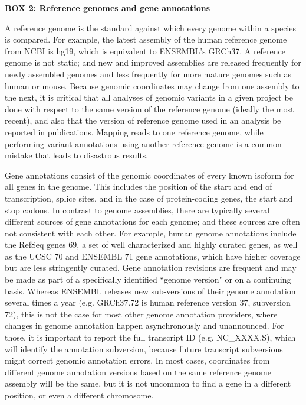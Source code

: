 \textbf{BOX 2: Reference genomes and gene annotations}
\begin{framed}
A reference genome is the standard against which every genome within a species is compared. For example, the latest assembly of the human reference genome from NCBI is hg19, which is equivalent to ENSEMBL’s GRCh37. A reference genome is not static; and new and improved assemblies are released frequently for newly assembled genomes and less frequently for more mature genomes such as human or mouse. Because genomic coordinates may change from one assembly to the next, it is critical that all analyses of genomic variants in a given project be done with respect to the same version of the reference genome (ideally the most recent), and also that the version of reference genome used in an analysis be reported in publications. Mapping reads to one reference genome, while performing variant annotations using another reference genome is a common mistake that leads to disastrous results.

Gene annotations consist of the genomic coordinates of every known isoform for all genes in the genome. This includes the position of the start and end of transcription, splice sites, and in the case of protein-coding genes, the start and stop codons. In contrast to genome assemblies, there are typically several different sources of gene annotations for each genome; and these sources are often not consistent with each other. For example, human genome annotations include the RefSeq genes 69, a set of well characterized and highly curated genes, as well as the UCSC 70 and ENSEMBL 71 gene annotations, which have higher coverage but are less stringently curated. Gene annotation revisions are frequent and may be made as part of a specifically identified ``genome version" or on a continuing basis. Whereas ENSEMBL releases new sub-versions of their genome annotation several times a year (e.g. GRCh37.72 is human reference version 37, subversion 72), this is not the case for most other genome annotation providers, where changes in genome annotation happen asynchronously and unannounced. For those, it is important to report the full transcript ID (e.g. NC\_XXXX.S), which will identify the annotation subversion, because future transcript subversions might correct genomic annotation errors. In most cases, coordinates from different genome annotation versions based on the same reference genome assembly will be the same, but it is not uncommon to find a gene in a different position, or even a different chromosome.


\end{framed}
